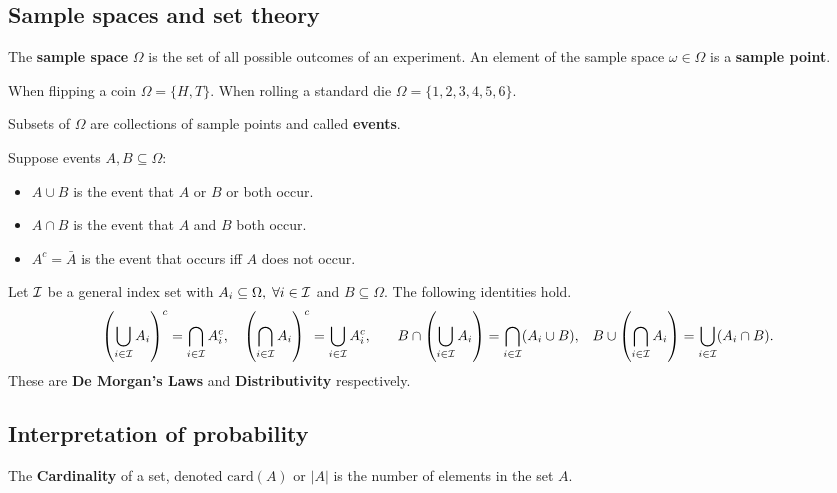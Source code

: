 \subsection{Sample spaces and set theory}

\begin{definition}
    The \textbf{sample space} $\Omega$ is the set of all possible outcomes of an experiment. An element of the sample space $\omega \in \Omega$ is a \textbf{sample point}.
\end{definition}

\begin{examples}
    When flipping a coin $\Omega  = \{H,T\}$. When rolling a standard die $\Omega = \{1,2,3,4,5,6\}$.
\end{examples}

\begin{definition}
    Subsets of $\Omega$ are collections of sample points and called \textbf{events}.
\end{definition}

Suppose events $A,B\subseteq\Omega$:
\begin{itemize}
    \item $A\cup B$ is the event that $A$ or $B$ or both occur.
    \item $A\cap B$ is the event that $A$ and $B$ both occur.
    \item $A^c = \bar{A}$ is the event that occurs iff $A$ does not occur.
\end{itemize}


Let $\mathcal{I}$ be a general index set with $A_i \subseteq\Omega,\; \forall i \in\mathcal{I}$ and $B \subseteq \Omega$. The following identities hold.
\[
\left( \bigcup_{i\in\mathcal{I}}A_i \right)^c = \bigcap_{i\in\mathcal{I}}A_i^c \textcolor{black}{,} \quad
\left( \bigcap_{i\in\mathcal{I}}A_i \right)^c = \bigcup_{i\in\mathcal{I}}A_i^c \textcolor{black}{,} \qquad
B \cap \left( \bigcup_{i\in\mathcal{I}}A_i \right) = \bigcap_{i\in\mathcal{I}}(A_i\cup B) \textcolor{black}{,} \quad
B \cup \left( \bigcap_{i\in\mathcal{I}}A_i \right) = \bigcup_{i\in\mathcal{I}}(A_i\cap B) \textcolor{black}{.}
\]
These are \textbf{De Morgan's Laws} and \textbf{Distributivity} respectively.


\subsection{Interpretation of probability}
\begin{definition}
    The \textbf{Cardinality} of a set, denoted $\text{card}(A)$ or $|A|$ is the number of elements in the set $A$.
\end{definition}

